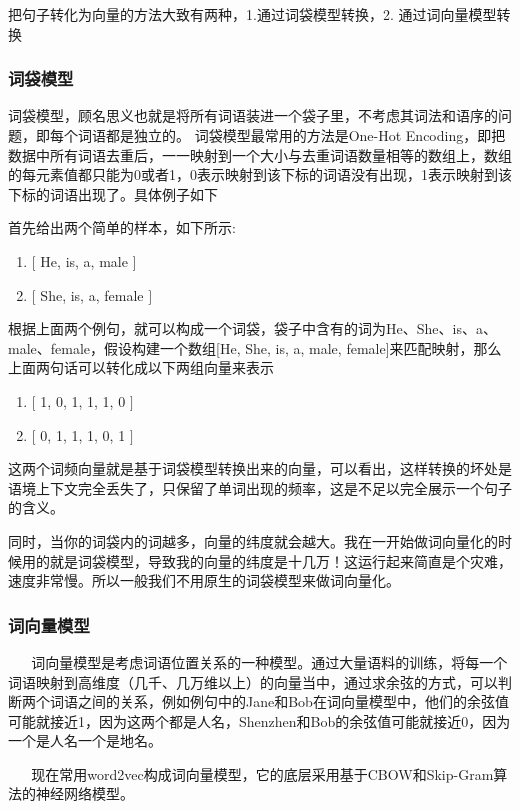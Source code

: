 把句子转化为向量的方法大致有两种，1.通过词袋模型转换，2. 通过词向量模型转换


\subsubsection{词袋模型}
词袋模型，顾名思义也就是将所有词语装进一个袋子里，不考虑其词法和语序的问题，即每个词语都是独立的。
词袋模型最常用的方法是One-Hot Encoding，即把数据中所有词语去重后，一一映射到一个大小与去重词语数量相等的数组上，数组的每元素值都只能为0或者1，0表示映射到该下标的词语没有出现，1表示映射到该下标的词语出现了。具体例子如下

\newpage
首先给出两个简单的样本，如下所示: 

\begin{enumerate}
	\item $[$ He, is, a, male $]$
	\item $[$ She, is, a, female $]$
\end{enumerate}

根据上面两个例句，就可以构成一个词袋，袋子中含有的词为He、She、is、a、male、female，假设构建一个数组[He, She, is, a, male, female]来匹配映射，那么上面两句话可以转化成以下两组向量来表示

\begin{enumerate}
	\item $[$ 1, 0, 1, 1, 1, 0 $]$
	\item $[$ 0, 1, 1, 1, 0, 1 $]$
\end{enumerate}
	
这两个词频向量就是基于词袋模型转换出来的向量，可以看出，这样转换的坏处是语境上下文完全丢失了，只保留了单词出现的频率，这是不足以完全展示一个句子的含义。

同时，当你的词袋内的词越多，向量的纬度就会越大。我在一开始做词向量化的时候用的就是词袋模型，导致我的向量的纬度是十几万！这运行起来简直是个灾难，速度非常慢。所以一般我们不用原生的词袋模型来做词向量化。

\subsubsection{词向量模型}

    词向量模型是考虑词语位置关系的一种模型。通过大量语料的训练，将每一个词语映射到高维度（几千、几万维以上）的向量当中，通过求余弦的方式，可以判断两个词语之间的关系，例如例句中的Jane和Bob在词向量模型中，他们的余弦值可能就接近1，因为这两个都是人名，Shenzhen和Bob的余弦值可能就接近0，因为一个是人名一个是地名。

    现在常用word2vec构成词向量模型，它的底层采用基于CBOW和Skip-Gram算法的神经网络模型。

